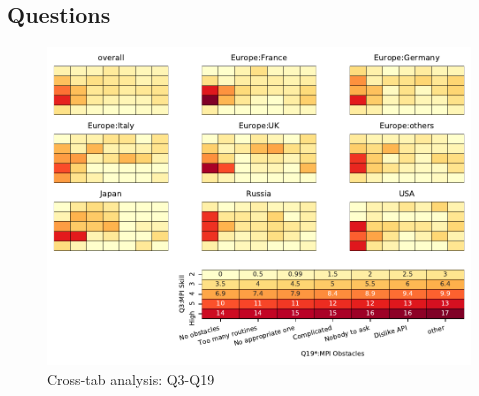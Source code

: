 
\subsection{Questions}


\begin{figure}
\begin{center}
\includegraphics[width=12cm]{../pdfs/Q3-Q19.pdf}
\caption{Cross-tab analysis: Q3-Q19}
\label{fig:Q3-Q19}
\end{center}
\end{figure}
